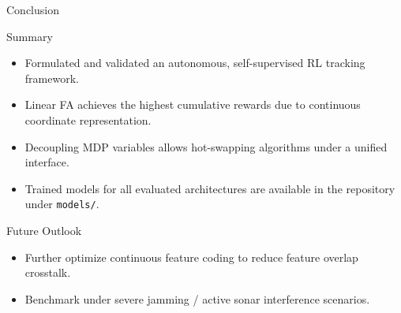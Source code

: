 \documentclass[10pt]{beamer}
\begin{document}
\begin{frame}{Conclusion}
    \begin{block}{Summary}
        \begin{itemize}
            \item Formulated and validated an autonomous, self-supervised RL tracking framework.
            \item Linear FA achieves the highest cumulative rewards due to continuous coordinate representation.
            \item Decoupling MDP variables allows hot-swapping algorithms under a unified interface.
            \item Trained models for all evaluated architectures are available in the repository under \texttt{models/}.
        \end{itemize}
    \end{block}
    
    \begin{block}{Future Outlook}
        \begin{itemize}
            \item Further optimize continuous feature coding to reduce feature overlap crosstalk.
            \item Benchmark under severe jamming / active sonar interference scenarios.
        \end{itemize}
    \end{block}
\end{frame}
\end{document}
